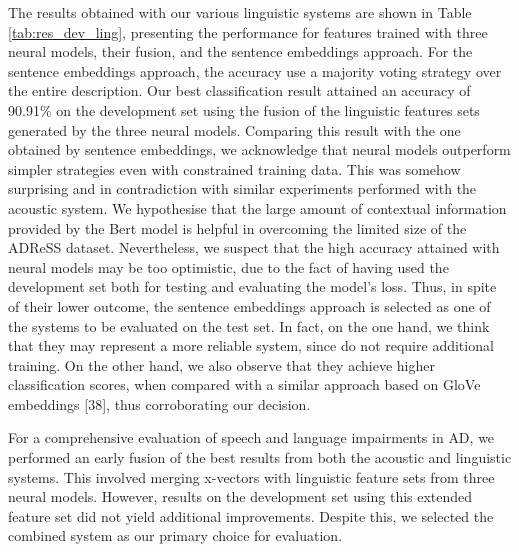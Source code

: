   The results obtained with our various linguistic systems are shown in Table \ref{tab:res_dev_ling}, presenting the performance for features trained with three neural models, their fusion, and the sentence embeddings approach. For the sentence embeddings approach, the accuracy use a majority voting strategy over the entire description. Our best classification result attained an accuracy of 90.91\% on the development set using the fusion of the linguistic features sets generated by the three neural models. Comparing this result with the one obtained by sentence embeddings, we acknowledge that neural models outperform simpler strategies even with constrained training data. This was somehow surprising and in contradiction with similar experiments performed with the acoustic system. We hypothesise that the large amount of contextual information provided by the Bert model is helpful in overcoming the limited size of the ADReSS dataset. Nevertheless, we suspect that the high accuracy attained with neural models may be too optimistic, due to the fact of having used the development set both for testing and evaluating the model’s loss. Thus, in spite of their lower outcome, the sentence embeddings approach is selected as one of the systems to be evaluated on the test set. In fact, on the one hand, we think that they may represent a more reliable system, since do not require additional training. On the other hand, we also observe that they achieve higher classification scores, when compared with a similar approach based on GloVe embeddings [38], thus corroborating our decision.

  For a comprehensive evaluation of speech and language impairments in \ac{AD}, we performed an early fusion of the best results from both the acoustic and linguistic systems. This involved merging x-vectors with linguistic feature sets from three neural models. However, results on the development set using this extended feature set did not yield additional improvements. Despite this, we selected the combined system as our primary choice for evaluation.

